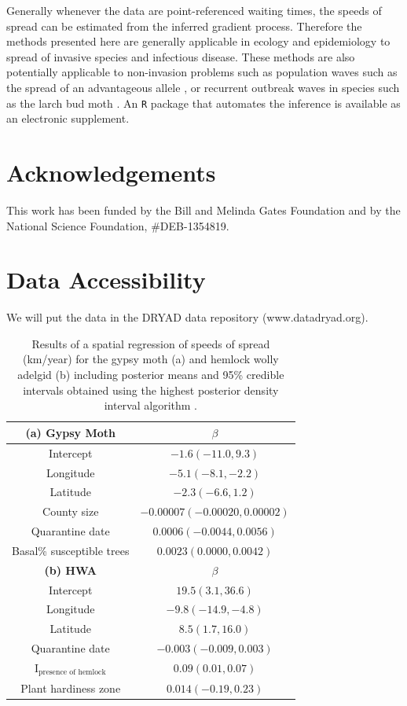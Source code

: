 \documentclass[12pt]{article}
\begin{document}
Generally whenever the data are point-referenced waiting times, the speeds of spread can be estimated from the inferred gradient process. Therefore the methods presented here are generally applicable in ecology and epidemiology to spread of invasive species and infectious disease. These methods are also potentially applicable to non-invasion problems such as population waves such as the spread of an advantageous allele \citep{fisher1937wave}, or recurrent outbreak waves in species such as the larch bud moth \citep{johnson2004landscape}. An \texttt{R} package that automates the inference is available as an electronic supplement.


\section{Acknowledgements}

This work has been funded by the Bill and Melinda Gates Foundation and by the National Science Foundation, \#DEB-1354819.

\section{Data Accessibility}

We will put the data in the DRYAD data repository (www.datadryad.org).

\clearpage




\clearpage

\begin{table}
\centering
\caption{Results of a spatial regression of speeds of spread (km/year) for the gypsy moth (a) and hemlock wolly adelgid (b) including posterior means and 95\% credible intervals obtained using the highest posterior density interval algorithm \citep{chen2000hpd}.}
\begin{tabular}{c|c}
{\bf (a) Gypsy Moth} & $\beta$ \\
\hline
Intercept & $-1.6 (-11.0,9.3)$ \\
Longitude & $-5.1 (-8.1,-2.2)$ \\
Latitude & $-2.3 (-6.6,1.2)$ \\
County size & $-0.00007 (-0.00020,0.00002)$ \\
Quarantine date & $0.0006 (-0.0044, 0.0056)$ \\
Basal\% susceptible trees & $0.0023 (0.0000, 0.0042)$ \\
\hline
{\bf (b) HWA} & $\beta$ \\
\hline
Intercept & $19.5 (3.1,36.6)$ \\
Longitude & $-9.8 (-14.9,-4.8)$ \\
Latitude & $8.5 (1.7,16.0)$ \\
Quarantine date & $-0.003 (-0.009,0.003)$ \\
I$_{\text{presence of hemlock}}$ & $0.09(0.01,0.07)$ \\
Plant hardiness zone & $0.014 (-0.19,0.23)$ \\
\end{tabular}
\label{table:regression}
\end{table}
\end{document}
